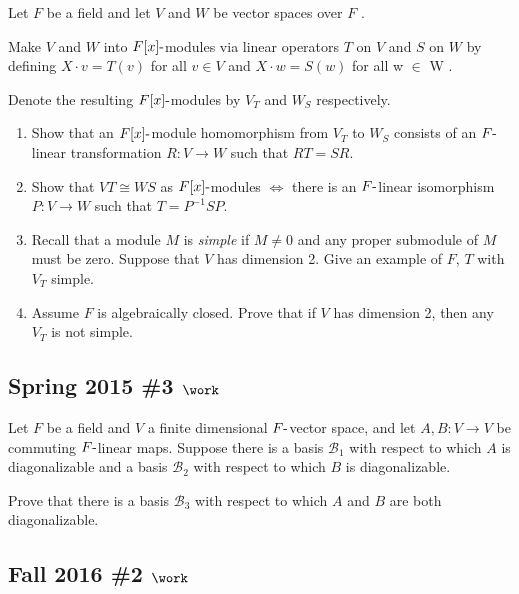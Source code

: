 Let \(F\) be a field and let \(V\) and \(W\) be vector spaces over \(F\)
.

Make \(V\) and \(W\) into \(F[x]{\hbox{-}}\)modules via linear operators
\(T\) on \(V\) and \(S\) on \(W\) by defining \(X \cdot v = T (v)\) for
all \(v \in V\) and \(X \cdot w = S(w)\) for all w \(\in\) W .

Denote the resulting \(F[x]{\hbox{-}}\)modules by \(V_T\) and \(W_S\)
respectively.

\begin{enumerate}
\def\labelenumi{\alph{enumi}.}
\item
  Show that an \(F[x]{\hbox{-}}\)module homomorphism from \(V_T\) to
  \(W_S\) consists of an \(F{\hbox{-}}\)linear transformation
  \(R : V \to W\) such that \(RT = SR\).
\item
  Show that \(VT \cong WS\) as \(F[x]{\hbox{-}}\)modules \(\iff\) there
  is an \(F{\hbox{-}}\)linear isomorphism \(P : V \to W\) such that
  \(T = P^{-1}SP\).
\item
  Recall that a module \(M\) is \emph{simple} if \(M \neq 0\) and any
  proper submodule of \(M\) must be zero. Suppose that \(V\) has
  dimension 2. Give an example of \(F\), \(T\) with \(V_T\) simple.
\item
  Assume \(F\) is algebraically closed. Prove that if \(V\) has
  dimension 2, then any \(V_T\) is not simple.
\end{enumerate}

\hypertarget{spring-2015-3-work}{%
\subsection{\texorpdfstring{Spring 2015 \#3
\(\work\)}{Spring 2015 \#3 \textbackslash work}}\label{spring-2015-3-work}}

Let \(F\) be a field and \(V\) a finite dimensional
\(F{\hbox{-}}\)vector space, and let \(A, B: V\to V\) be commuting
\(F{\hbox{-}}\)linear maps. Suppose there is a basis \({\mathcal{B}}_1\)
with respect to which \(A\) is diagonalizable and a basis
\({\mathcal{B}}_2\) with respect to which \(B\) is diagonalizable.

Prove that there is a basis \({\mathcal{B}}_3\) with respect to which
\(A\) and \(B\) are both diagonalizable.

\hypertarget{fall-2016-2-work}{%
\subsection{\texorpdfstring{Fall 2016 \#2
\(\work\)}{Fall 2016 \#2 \textbackslash work}}\label{fall-2016-2-work}}

